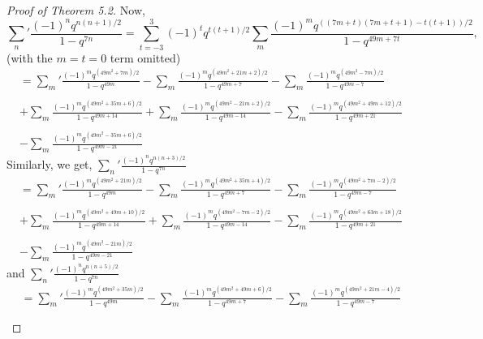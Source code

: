 \documentclass[10pt,reqno]{amsart}
\begin{document}
\begin{proof}[Proof of Theorem 5.2]
Now, 
\begin{equation*}
    \displaystyle\sum_{n}'\displaystyle\frac{(-1)^nq^{n(n+1)/2}}{1-q^{7n}}=\displaystyle\sum_{t=-3}^{3}(-1)^tq^{t(t+1)/2}\displaystyle\sum_{m}\displaystyle\frac{(-1)^mq^{((7m+t)(7m+t+1)-t(t+1))/2}}{1-q^{49m+7t}},
\end{equation*}
(with the $m=t=0$ term omitted)
\begin{multline} 
    =\displaystyle\sum_{m}'\displaystyle\frac{(-1)^mq^{(49m^2+7m)/2}}{1-q^{49m}}-\displaystyle\sum_{m}\displaystyle\frac{(-1)^mq^{(49m^2+21m+2)/2}}{1-q^{49m+7}}-\displaystyle\sum_{m}\displaystyle\frac{(-1)^mq^{(49m^2-7m)/2}}{1-q^{49m-7}}\\ \\
    +\displaystyle\sum_{m}\displaystyle\frac{(-1)^mq^{(49m^2+35m+6)/2}}{1-q^{49m+14}}+\displaystyle\sum_{m}\displaystyle\frac{(-1)^mq^{(49m^2-21m+2)/2}}{1-q^{49m-14}}-\displaystyle\sum_{m}\displaystyle\frac{(-1)^mq^{(49m^2+49m+12)/2}}{1-q^{49m+21}}\\ \\
    -\displaystyle\sum_{m}\displaystyle\frac{(-1)^mq^{(49m^2-35m+6)/2}}{1-q^{49m-21}}
\end{multline}
Similarly, we get, $\displaystyle\sum_{n}'\displaystyle\frac{(-1)^nq^{n(n+3)/2}}{1-q^{7n}}$
\begin{multline}
    =\displaystyle\sum_{m}'\displaystyle\frac{(-1)^mq^{(49m^2+21m)/2}}{1-q^{49m}}-\displaystyle\sum_{m}\displaystyle\frac{(-1)^mq^{(49m^2+35m+4)/2}}{1-q^{49m+7}}-\displaystyle\sum_{m}\displaystyle\frac{(-1)^mq^{(49m^2+7m-2)/2}}{1-q^{49m-7}}\\ \\
    +\displaystyle\sum_{m}\displaystyle\frac{(-1)^mq^{(49m^2+49m+10)/2}}{1-q^{49m+14}}+\displaystyle\sum_{m}\displaystyle\frac{(-1)^mq^{(49m^2-7m-2)/2}}{1-q^{49m-14}}-\displaystyle\sum_{m}\displaystyle\frac{(-1)^mq^{(49m^2+63m+18)/2}}{1-q^{49m+21}}\\ \\
    -\displaystyle\sum_{m}\displaystyle\frac{(-1)^mq^{(49m^2-21m)/2}}{1-q^{49m-21}}
\end{multline}
and $\displaystyle\sum_{n}'\displaystyle\frac{(-1)^nq^{n(n+5)/2}}{1-q^{7n}}$
\begin{multline}
    =\displaystyle\sum_{m}'\displaystyle\frac{(-1)^mq^{(49m^2+35m)/2}}{1-q^{49m}}-\displaystyle\sum_{m}\displaystyle\frac{(-1)^mq^{(49m^2+49m+6)/2}}{1-q^{49m+7}}-\displaystyle\sum_{m}\displaystyle\frac{(-1)^mq^{(49m^2+21m-4)/2}}{1-q^{49m-7}}\\ \\

\end{multline}
\end{proof}
\end{document}
